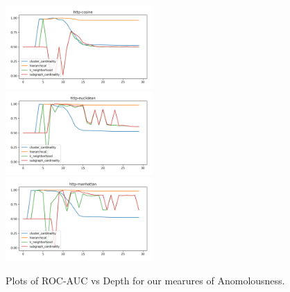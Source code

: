 \begin{figure}[!t]
\includegraphics[width=2.2in]{kdd/static/auc_vs_depth/http-cosine.png}
\includegraphics[width=2.2in]{kdd/static/auc_vs_depth/http-euclidean.png}
\includegraphics[width=2.2in]{kdd/static/auc_vs_depth/http-manhattan.png}

\caption{
Plots of ROC-AUC vs Depth for our mearures of Anomolousness.
}

\label{results:datasets_3}
\end{figure}


